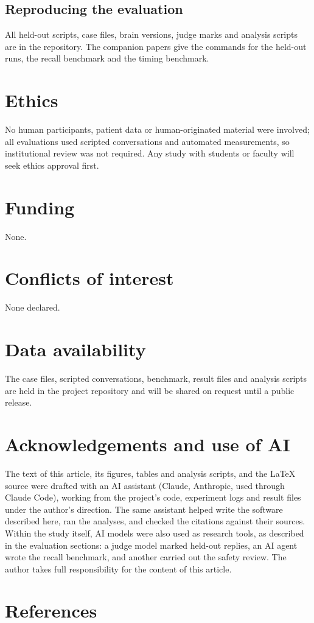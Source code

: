 \documentclass{article}
\begin{document}
\subsection*{Reproducing the evaluation}
All held-out scripts, case files, brain versions, judge marks and analysis scripts are in the repository. The companion papers give the commands
for the held-out runs, the recall benchmark and the timing benchmark.

\section*{Ethics}
No human participants, patient data or human-originated material were involved; all evaluations used scripted conversations and automated measurements, so institutional review was not required. Any study with students or faculty will seek ethics approval first.

\section*{Funding}
None.

\section*{Conflicts of interest}
None declared.

\section*{Data availability}
The case files, scripted conversations, benchmark, result files and analysis scripts are held in the project repository and will be shared on request until a public release.

\section*{Acknowledgements and use of AI}
The text of this article, its figures, tables and analysis scripts, and the \LaTeX{} source were
drafted with an AI assistant (Claude, Anthropic, used through Claude Code), working from the project's code, experiment logs and result
files under the author's direction. The same assistant helped write the software described here, ran the analyses, and checked the
citations against their sources. Within the study itself, AI models were also used as research tools, as described in the evaluation sections: a judge model marked held-out replies, an AI agent wrote the recall benchmark, and another carried out the safety review. The author takes full responsibility for the content of this article.

\section*{References}
\end{document}

